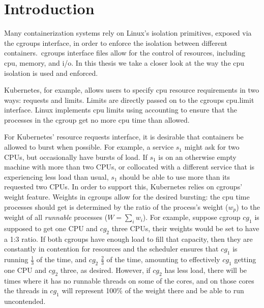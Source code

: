 
\section{Introduction}
\label{sec:introduction}

Many containerization systems rely on Linux's isolation primitives, exposed via
the cgroups interface, in order to enforce the isolation between different
containers.\ cgroups interface files allow for the control of resources,
including cpu, memory, and i/o. In this thesis we take a closer look at the way
the cpu isolation is used and enforced. 

Kubernetes\cite{kubernetes}, for example, allows users to specify cpu resource
requirements in two ways: requests and limits. Limits are directly passed on to
the cgroups cpu.limit interface. Linux implements cpu limits using accounting to
ensure that the processes in the cgroup get no more cpu time than
allowed.

For Kubernetes' resource requests interface, it is desirable that containers be
allowed to burst when possible. For example, a service $s_1$ might ask for two
CPUs, but occasionally have bursts of load. If $s_1$ is on an otherwise empty
machine with more than two CPUs, or collocated with a different service that is
experiencing less load than usual, $s_1$ should be able to use more than its
requested two CPUs. In order to support this, Kubernetes relies on cgroups'
weight feature. Weights in cgroups allow for the desired bursting: the cpu time
processes should get is determined by the ratio of the process's weight ($w_p$)
to the weight of all \textit{runnable} processes ($W = \sum_i w_i$). For
example, suppose cgroup $cg_1$ is supposed to get one CPU and $cg_2$ three CPUs,
their weights would be set to have a 1:3 ratio. If both cgroups have enough load
to fill that capacity, then they are constantly in contention for resources and
the scheduler ensures that $cg_1$ is running $\frac{1}{3}$ of the time, and
$cg_2$ $\frac{2}{3}$ of the time, amounting to effectively $cg_1$ getting one
CPU and $cg_2$ three, as desired. However, if $cg_2$ has less load, there will
be times where it has no runnable threads on some of the cores, and on those
cores the threads in $cg_1$ will represent 100\% of the weight there and be able
to run uncontended.


